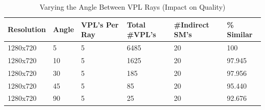 \begin{table}[h!]
	\caption{Varying the Angle Between VPL Rays (Impact on Quality)}
	\begin{center}
	    \begin{tabular}{ | l | l | l | l | l | l |}
	    \hline
	    Resolution & Angle & VPL's Per Ray & Total \#VPL's & \#Indirect SM's & \% Similar\\ \hline
	    1280x720 & 5 & 5 & 6485 & 20 & 100\\ \hline
	    1280x720 & 10 & 5 & 1625 & 20 & 97.945\\ \hline
	    1280x720 & 30 & 5 & 185 & 20 & 97.956\\ \hline
	    1280x720 & 45 & 5 & 85 & 20 & 95.440\\ \hline
	    1280x720 & 90 & 5 & 25 & 20 & 92.676\\ \hline
	    \end{tabular}
	\end{center}
	\label{table:5.5}
\end{table}

